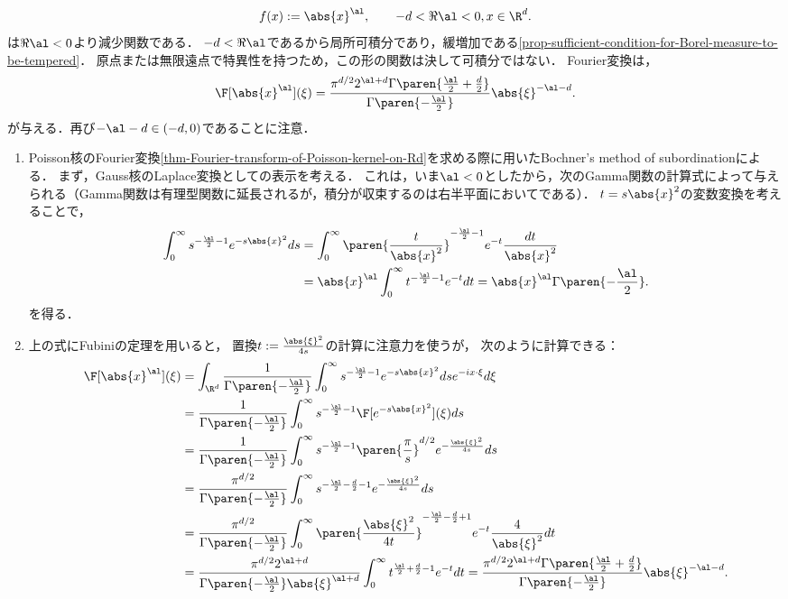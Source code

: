 \documentclass[uplatex,dvipdfmx]{jsreport}
\begin{document}
\begin{example}[$d$次元での計算]\label{exp-Fourier-transform-of-absxalpha}
    \[f(x):=\abs{x}^{\al},\qquad-d<\Re\al<0,x\in\R^d.\]
    は$\Re\al<0$より減少関数である．
    $-d<\Re\al$であるから局所可積分であり，緩増加である\ref{prop-sufficient-condition-for-Borel-measure-to-be-tempered}．
    原点または無限遠点で特異性を持つため，この形の関数は決して可積分ではない．
    Fourier変換は，
    \[\F[\abs{x}^{\al}](\xi)=\frac{\pi^{d/2}2^{\al+d}\Gamma\paren{\frac{\al}{2}+\frac{d}{2}}}{\Gamma\paren{-\frac{\al}{2}}}\abs{\xi}^{-\al-d}.\]
    が与える．再び$-\al-d\in(-d,0)$であることに注意．
\end{example}
\begin{Proof}\mbox{}
    \begin{enumerate}[{Step}1]
        \item Poisson核のFourier変換\ref{thm-Fourier-transform-of-Poisson-kernel-on-Rd}を求める際に用いたBochner's method of subordinationによる．
        まず，Gauss核のLaplace変換としての表示を考える．
        これは，いま$\al<0$としたから，次のGamma関数の計算式によって与えられる（Gamma関数は有理型関数に延長されるが，積分が収束するのは右半平面においてである）．
        $t=s\abs{x}^2$の変数変換を考えることで，
        \begin{align*}
            \int^\infty_0s^{-\frac{\al}{2}-1}e^{-s\abs{x}^2}ds&=\int^\infty_0\paren{\frac{t}{\abs{x}^2}}^{-\frac{\al}{2}-1}e^{-t}\frac{dt}{\abs{x}^2}\\
            &=\abs{x}^\al\int^\infty_0t^{-\frac{\al}{2}-1}e^{-t}dt=\abs{x}^\al\Gamma\paren{-\frac{\al}{2}}.
        \end{align*}
        を得る．
        \item 上の式にFubiniの定理を用いると，
        置換$t:=\frac{\abs{\xi}^2}{4s}$の計算に注意力を使うが，
        次のように計算できる：
        \begin{align*}
            \F[\abs{x}^{\al}](\xi)&=\int_{\R^d}\frac{1}{\Gamma\paren{-\frac{\al}{2}}}\int^\infty_0s^{-\frac{\al}{2}-1}e^{-s\abs{x}^2}dse^{-ix\cdot\xi}d\xi\\
            &=\frac{1}{\Gamma\paren{-\frac{\al}{2}}}\int^\infty_0s^{-\frac{\al}{2}-1}\F[e^{-s\abs{x}^2}](\xi)ds\\
            &=\frac{1}{\Gamma\paren{-\frac{\al}{2}}}\int^\infty_0s^{-\frac{\al}{2}-1}\paren{\frac{\pi}{s}}^{d/2}e^{-\frac{\abs{\xi}^2}{4s}}ds\\
            &=\frac{\pi^{d/2}}{\Gamma\paren{-\frac{\al}{2}}}\int^\infty_0s^{-\frac{\al}{2}-\frac{d}{2}-1}e^{-\frac{\abs{\xi}^2}{4s}}ds\\
            &=\frac{\pi^{d/2}}{\Gamma\paren{-\frac{\al}{2}}}\int^\infty_0\paren{\frac{\abs{\xi}^2}{4t}}^{-\frac{\al}{2}-\frac{d}{2}+1}e^{-t}\frac{4}{\abs{\xi}^2}dt\\
            &=\frac{\pi^{d/2}2^{\al+d}}{\Gamma\paren{-\frac{\al}{2}}\abs{\xi}^{\al+d}}\int^\infty_0t^{\frac{\al}{2}+\frac{d}{2}-1}e^{-t}dt=\frac{\pi^{d/2}2^{\al+d}\Gamma\paren{\frac{\al}{2}+\frac{d}{2}}}{\Gamma\paren{-\frac{\al}{2}}}\abs{\xi}^{-\al-d}.
        \end{align*}
    \end{enumerate}
\end{Proof}
\end{document}
